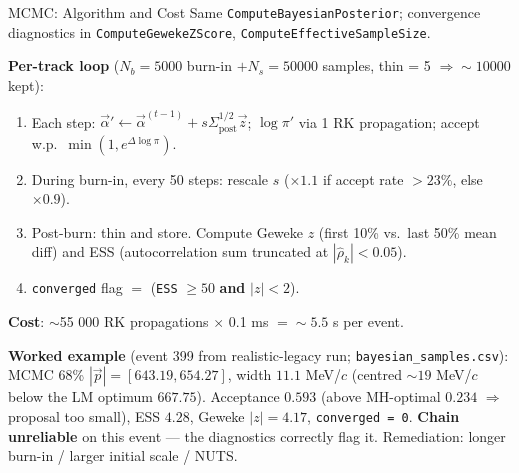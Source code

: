 \documentclass[aspectratio=169]{beamer}
\begin{document}
\begin{frame}{MCMC: Algorithm and Cost}
\small
Same \texttt{ComputeBayesianPosterior}; convergence diagnostics in \texttt{ComputeGewekeZScore}, \texttt{ComputeEffectiveSampleSize}.

\textbf{Per-track loop} ($N_b = 5000$ burn-in $+ N_s = 50000$ samples, thin = 5 $\Rightarrow \sim 10000$ kept):
\begin{enumerate}\setlength{\itemsep}{0pt}
\item Each step: $\vec{\alpha}' \gets \vec{\alpha}^{(t-1)} + s \Sigma_\mathrm{post}^{1/2} \vec{z}$; $\log\pi'$ via 1 RK propagation; accept w.p.\ $\min(1, e^{\Delta\log\pi})$.
\item During burn-in, every 50 steps: rescale $s$ ($\times 1.1$ if accept rate $> 23\%$, else $\times 0.9$).
\item Post-burn: thin and store. Compute Geweke $z$ (first 10\% vs.\ last 50\% mean diff) and ESS (autocorrelation sum truncated at $|\hat\rho_k| < 0.05$).
\item \texttt{converged} flag $=$ (\texttt{ESS} $\geq 50$ \textbf{and} $|z| < 2$).
\end{enumerate}

\textbf{Cost}: $\sim$55 000 RK propagations $\times$ 0.1 ms $= \sim 5.5$ s per event.

\vspace{0.1cm}
\textbf{Worked example} (event 399 from realistic-legacy run; \texttt{bayesian\_samples.csv}):
MCMC 68\% $|\vec p| = [643.19, 654.27]$, width $11.1$ MeV/$c$ (centred $\sim 19$ MeV/$c$ below the LM optimum $667.75$). Acceptance $0.593$ (above MH-optimal $0.234$ $\Rightarrow$ proposal too small), ESS $4.28$, Geweke $|z| = 4.17$, \texttt{converged = 0}. \textbf{Chain unreliable} on this event --- the diagnostics correctly flag it. Remediation: longer burn-in / larger initial scale / NUTS.
\end{frame}
\end{document}
